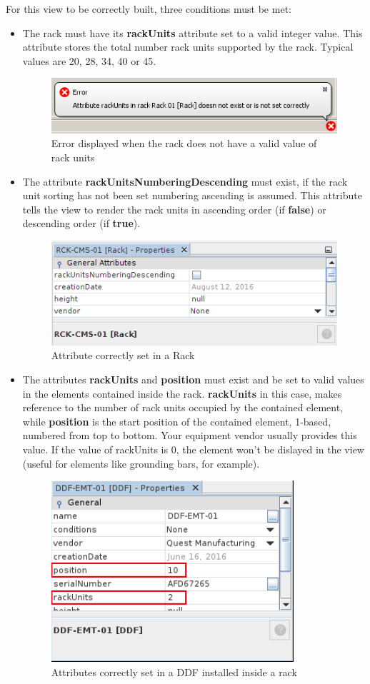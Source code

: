 \documentclass[a4paper]{article}
\begin{document}
		For this view to be correctly built, three conditions must be met:
		\begin{itemize}
			\item The rack must have its \textbf{rackUnits} attribute set to a valid integer value. This attribute stores the total number rack units supported by the rack. Typical values are 20, 28, 34, 40 or 45.
			\begin{figure}[h!]
				\centering
				\includegraphics[width=0.6\linewidth]{img/error_rack_view_not_rackunits.png}
				\caption{Error displayed when the rack does not have a valid value of rack units}
				\label{fig:error_rack_view_not_rackunits}
			\end{figure}
			\item The attribute \textbf{rackUnitsNumberingDescending} must exist, if the rack unit sorting has not been set numbering ascending is assumed. This attribute tells the view to render the rack units in ascending order (if \textbf{false}) or descending order (if \textbf{true}).
			\begin{figure}
				\centering
				\includegraphics[width=0.4\linewidth]{img/rack_units_numbering_descending_attribute.png}
				\caption{Attribute correctly set in a Rack}
				\label{fig:rack_units_numbering_descending_attribute}
			\end{figure}
			\item The attributes \textbf{rackUnits} and \textbf{position} must exist and be set to valid values in the elements contained inside the rack. \textbf{rackUnits} in this case, makes reference to the number of rack units occupied by the contained element, while \textbf{position} is the start position of the contained element, 1-based, numbered from top to bottom. Your equipment vendor usually provides this value. If the value of rackUnits is 0, the element won't be dislayed in the view (useful for elements like grounding bars, for example).
			\begin{figure}[h!]
				\centering
				\includegraphics[width=0.4\linewidth]{img/rack_view_attributes_contained_element.png}
				\caption{Attributes correctly set in a DDF installed inside a rack}
				\label{fig:rack_view_attributes_contained_element}
			\end{figure}
		\end{itemize}
\end{document}
